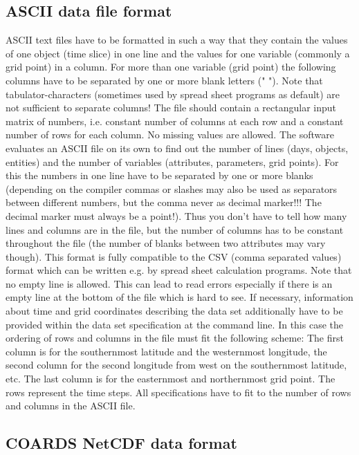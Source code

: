 \documentclass[12pt, oneside, a4paper, headsepline, plainheadsepline]{scrbook}
\begin{document}
\subsection{ASCII data file format}

ASCII text files have to be formatted in such a way that they contain the values of one object (time slice) in one line 
and the values for one variable (commonly a grid point) in a column. For more than one variable (grid point) the following columns
have to be separated by one or more blank letters (" "). Note that tabulator-characters (sometimes used by spread sheet programs as default) are not sufficient to separate columns! 
The file should contain a rectangular input matrix of numbers, 
i.e. constant number of columns at each row and a constant number of rows for each column. 
No missing values are allowed. 
The software evaluates an ASCII file 
on its own to find out the number of lines (days, objects, entities) and the number of variables 
(attributes, parameters, grid points). For this the numbers in one line have 
to be separated by one or more blanks (depending on the compiler commas or slashes may also
be used as separators between different numbers, but the comma never as decimal marker!!! 
The decimal marker must always be a point!). Thus you don't have to tell
how many lines and columns are in the file, but the number of columns has to be constant
throughout the file (the number of blanks between two attributes may vary though).
This format is fully compatible to the CSV (comma separated values) format which can be written
e.g. by spread sheet calculation programs. 
Note that no empty line is allowed. This can lead to read errors especially if there is
an empty line at the bottom of the file which is hard to see. 
If necessary, information about time and grid coordinates describing the data set additionally have to be provided within the
data set specification at the command line. In this case the ordering of rows and columns in the file must fit the following scheme: The first column is for the southernmost latitude 
and the westernmost longitude, the second column for the second longitude from west on the southernmost 
latitude, etc. The last column is for the easternmost and northernmost grid point. The rows represent the time steps.
All specifications have to fit to the number of rows and columns in the ASCII file.

\subsection{COARDS NetCDF data format}
\end{document}
